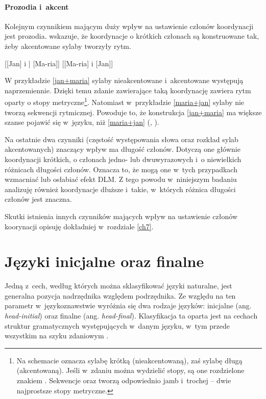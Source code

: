 \paragraph{Prozodia i~akcent}

Kolejnym czynnikiem mającym duży wpływ na ustawienie członów koordynacji jest prozodia. \cite{lohmann2014english} wskazuje, że koordynacje o krótkich członach są konstruowane tak, żeby akcentowane sylaby tworzyły rytm.

\begin{exe}
\ex \label{jan+maria} {
        {[[Jan] i | [Ma-ria]]}
}
\ex \label{maria+jan} {
        {[[Ma-ria] i [Jan]]}}
\end{exe}

W przykładzie \eqref{jan+maria} sylaby nieakcentowane i~akcentowane występują naprzemiennie. Dzięki temu zdanie zawierające taką koordynację zawiera rytm oparty o stopy metryczne\footnote{
Na schemacie  oznacza sylabę krótką (nieakcentowaną), zaś \metricsymbols{_} sylabę długą (akcentowaną). Jeśli w~zdaniu można wydzielić stopy, są one rozdzielone znakiem \metricsymbols{|}.  Sekwencje  oraz  tworzą odpowiednio jamb i~trochej -- dwie najprostsze stopy metryczne.}.
Natomiast w~przykładzie \eqref{maria+jan} sylaby nie tworzą sekwencji rytmicznej. Powoduje to, że konstrukcja \eqref{jan+maria} ma większe szanse pojawić się w~języku, niż \eqref{maria+jan} (\citealt{mcdonald1993word}, \citealt{wright2005ladies}).

Na ostatnie dwa czynniki (częstość występowania słowa oraz rozkład sylab akcentowanych) znaczący wpływ ma długość członów. Dotyczą one głównie koordynacji krótkich, o członach jedno- lub dwuwyrazowych i~o niewielkich różnicach długości członów. Oznacza to, że mogą one w~tych przypadkach wzmacniać lub osłabiać efekt DLM. Z tego powodu w~niniejszym badaniu analizuję również koordynacje dłuższe i~takie, w~których różnica długości członów jest znaczna.

Skutki istnienia innych czynników mających wpływ na ustawienie członów koorynacji opisuję dokładniej w~rozdziale \ref{ch7}. 

\section{Języki inicjalne oraz finalne}

Jedną z~cech, według których można sklasyfikować języki naturalne, jest generalna pozycja nadrzędnika względem podrzędnika. Ze względu na ten parametr w~językoznawstwie wyróżnia się dwa rodzaje języków: inicjalne (ang. \emph{head-initial}) oraz finalne (ang. \emph{head-final}). Klasyfikacja ta oparta jest na cechach struktur gramatycznych występujących w~danym języku, w~tym przede wszystkim na szyku zdaniowym \citep{polinsky2020headedness}.

